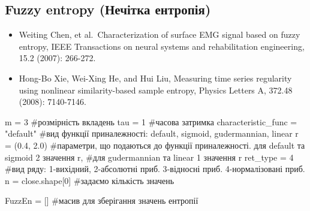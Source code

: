 \documentclass[
  letterpaper,
]{report}
\newenvironment{Shaded}{\begin{snugshade}}{\end{snugshade}}
\newcommand{\CommentTok}[1]{\textcolor[rgb]{0.37,0.37,0.37}{#1}}
\newcommand{\DecValTok}[1]{\textcolor[rgb]{0.68,0.00,0.00}{#1}}
\newcommand{\FloatTok}[1]{\textcolor[rgb]{0.68,0.00,0.00}{#1}}
\newcommand{\NormalTok}[1]{\textcolor[rgb]{0.00,0.23,0.31}{#1}}
\newcommand{\OperatorTok}[1]{\textcolor[rgb]{0.37,0.37,0.37}{#1}}
\newcommand{\StringTok}[1]{\textcolor[rgb]{0.13,0.47,0.30}{#1}}
\providecommand{\tightlist}{%
  \setlength{\itemsep}{0pt}\setlength{\parskip}{0pt}}\usepackage{longtable,booktabs,array}
\begin{document}
\hypertarget{fuzzy-entropy-ux43dux435ux447ux456ux442ux43aux430-ux435ux43dux442ux440ux43eux43fux456ux44f}{%
\subsection{Fuzzy entropy (Нечітка
ентропія)}\label{fuzzy-entropy-ux43dux435ux447ux456ux442ux43aux430-ux435ux43dux442ux440ux43eux43fux456ux44f}}

\begin{itemize}
\tightlist
\item
  Weiting Chen, et al.~Characterization of surface EMG signal based on
  fuzzy entropy, IEEE Transactions on neural systems and rehabilitation
  engineering, 15.2 (2007): 266-272.
\item
  Hong-Bo Xie, Wei-Xing He, and Hui Liu, Measuring time series
  regularity using nonlinear similarity-based sample entropy, Physics
  Letters A, 372.48 (2008): 7140-7146.
\end{itemize}

\begin{Shaded}
\begin{Highlighting}[]
\NormalTok{m }\OperatorTok{=} \DecValTok{3} \CommentTok{\#розмірність вкладень}
\NormalTok{tau }\OperatorTok{=} \DecValTok{1} \CommentTok{\#часова затримка}
\NormalTok{characteristic\_func }\OperatorTok{=} \StringTok{"default"} \CommentTok{\#вид функції приналежності: default, sigmoid, gudermannian, linear}
\NormalTok{r }\OperatorTok{=}\NormalTok{ (}\FloatTok{0.4}\NormalTok{, }\FloatTok{2.0}\NormalTok{) }\CommentTok{\#параметри, що подаються до функції приналежності. для default та sigmoid 2 значення r, }
                  \CommentTok{\#для gudermannian та linear 1 значення r  }
\NormalTok{ret\_type }\OperatorTok{=} \DecValTok{4} \CommentTok{\#вид ряду: 1{-}вихідний, 2{-}абсолютні приб. 3{-}відносні приб. 4{-}нормалізовані приб. }
\NormalTok{n }\OperatorTok{=}\NormalTok{ close.shape[}\DecValTok{0}\NormalTok{] }\CommentTok{\#задаємо кількість значень}

\NormalTok{FuzzEn }\OperatorTok{=}\NormalTok{ [] }\CommentTok{\#масив для зберігання значень ентропії}
\end{Highlighting}
\end{Shaded}
\end{document}
